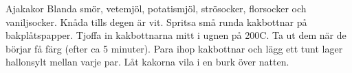 \documentclass{book}
\begin{document}
\thispagestyle{empty}

\begin{recipe}{Ajakakor}{}{}
  Blanda smör,\newline
  vetemjöl,\newline
  potatismjöl,\newline
  strösocker,\newline
  florsocker\newline
  och vaniljsocker.
  \newstep
  Knåda tills degen är vit.
  \newstep
  Spritsa små runda kakbottnar på bakplåtspapper.
  \newstep
  Tjoffa in kakbottnarna mitt i ugnen på 200\degrees C. Ta ut dem när de börjar
  få färg (efter ca 5 minuter).
  Para ihop kakbottnar och lägg ett tunt lager hallonsylt mellan varje par.
  \newstep
  Låt kakorna vila i en burk över natten.

\end{recipe}
\end{document}
